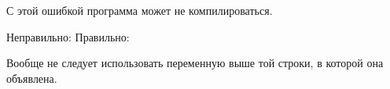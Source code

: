 \begin{typerror}
	\label{TE_pointer-before-declaration}

	С этой ошибкой программа может не компилироваться.

	Неправильно:
	Правильно:

	Вообще не следует использовать переменную выше той строки, в которой она объявлена.
\end{typerror}
